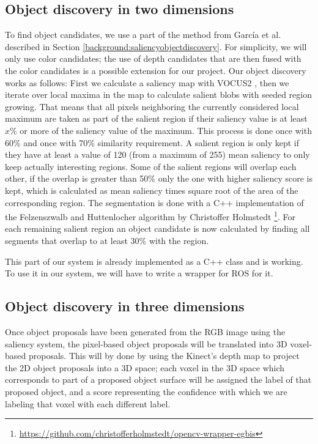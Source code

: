 \documentclass[a4paper,11pt,english]{article}
\begin{document}
\subsection{Object discovery in two dimensions}
\label{system:obj_discovery}
To find object candidates, we use a part of the method from García et al. described in Section \ref{background:saliencyobjectdiscovery}.
For simplicity, we will only use color candidates; the use of depth candidates that are then fused with the color candidates is a possible extension for our project.
Our object discovery works as follows: First we calculate a saliency map with VOCUS2 \cite{frintrop2015traditional}, then we iterate over local maxima in the map to calculate salient blobs with seeded region growing.
That means that all pixels neighboring the currently considered local maximum are taken as part of the salient region if their saliency value is at least \(x\)\% or more of the saliency value of the maximum.
This process is done once with 60\% and once with 70\% similarity requirement.
A salient region is only kept if they have at least a value of 120 (from a maximum of 255) mean saliency to only keep actually interesting regions.
Some of the salient regions will overlap each other, if the overlap is greater than 50\% only the one with higher saliency score is kept, which is calculated as mean saliency times square root of the area of the corresponding region.
The segmentation is done with a C++ implementation of the Felzenszwalb and Huttenlocher algorithm \cite{felzenszwalb2004efficient} by Christoffer Holmstedt \footnote{\url{https://github.com/christofferholmstedt/opencv-wrapper-egbis}}.
For each remaining salient region an object candidate is now calculated by finding all segments that overlap to at least 30\% with the region.

This part of our system is already implemented as a C++ class and is working. To use it in our system, we will have to write a wrapper for ROS for it.

\subsection{Object discovery in three dimensions}
\label{system:fusion}
Once object proposals have been generated from the RGB image using the saliency system, the pixel-based object proposals will be translated into 3D voxel-based proposals.
This will by done by using the Kinect's depth map to project the 2D object proposals into a 3D space; each voxel in the 3D space which corresponds to part of a proposed object surface will be assigned the label of that proposed object, and a score representing the confidence with which we are labeling that voxel with each different label.
\end{document}
